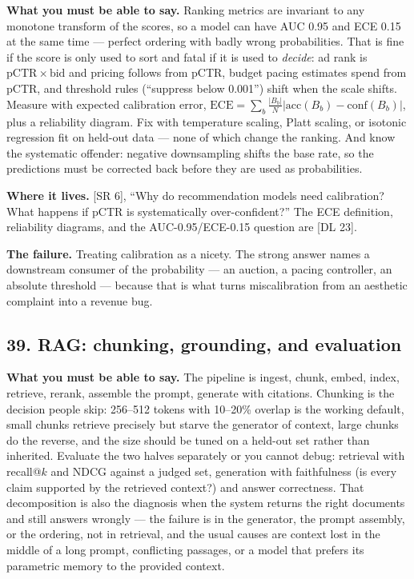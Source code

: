 \textbf{What you must be able to say.} Ranking metrics are invariant to any monotone transform of the scores, so a model can have AUC 0.95 and ECE 0.15 at the same time --- perfect ordering with badly wrong probabilities. That is fine if the score is only used to sort and fatal if it is used to \emph{decide}: ad rank is $\mathrm{pCTR} \times \mathrm{bid}$ and pricing follows from pCTR, budget pacing estimates spend from pCTR, and threshold rules (``suppress below 0.001'') shift when the scale shifts. Measure with expected calibration error, $\mathrm{ECE} = \sum_b \frac{|B_b|}{N}\left|\mathrm{acc}(B_b) - \mathrm{conf}(B_b)\right|$, plus a reliability diagram. Fix with temperature scaling, Platt scaling, or isotonic regression fit on held-out data --- none of which change the ranking. And know the systematic offender: negative downsampling shifts the base rate, so the predictions must be corrected back before they are used as probabilities.

\textbf{Where it lives.} [SR 6], ``Why do recommendation models need calibration? What happens if pCTR is systematically over-confident?'' The ECE definition, reliability diagrams, and the AUC-0.95/ECE-0.15 question are [DL 23].

\textbf{The failure.} Treating calibration as a nicety. The strong answer names a downstream consumer of the probability --- an auction, a pacing controller, an absolute threshold --- because that is what turns miscalibration from an aesthetic complaint into a revenue bug.

\subsection*{39. RAG: chunking, grounding, and evaluation}

\textbf{What you must be able to say.} The pipeline is ingest, chunk, embed, index, retrieve, rerank, assemble the prompt, generate with citations. Chunking is the decision people skip: 256--512 tokens with 10--20\% overlap is the working default, small chunks retrieve precisely but starve the generator of context, large chunks do the reverse, and the size should be tuned on a held-out set rather than inherited. Evaluate the two halves separately or you cannot debug: retrieval with recall@$k$ and NDCG against a judged set, generation with faithfulness (is every claim supported by the retrieved context?) and answer correctness. That decomposition is also the diagnosis when the system returns the right documents and still answers wrongly --- the failure is in the generator, the prompt assembly, or the ordering, not in retrieval, and the usual causes are context lost in the middle of a long prompt, conflicting passages, or a model that prefers its parametric memory to the provided context.

